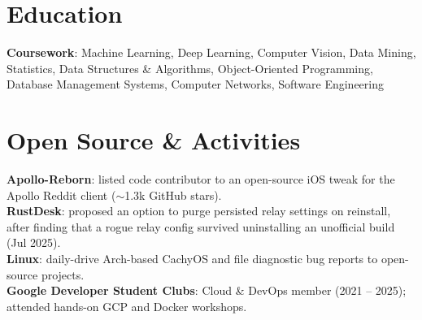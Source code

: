 \documentclass[a4paper]{article}
\begin{document}
\section{Education}
  \resumeSubHeadingListStart
    \eduGNIT
    \vspace{6pt}
    \eduIntermediate
  \resumeSubHeadingListEnd
\vspace{-8pt}
\begin{resumeBlock}
\textbf{Coursework}{: Machine Learning, Deep Learning, Computer Vision, Data Mining, Statistics, Data Structures \& Algorithms, Object-Oriented Programming, Database Management Systems, Computer Networks, Software Engineering}
\end{resumeBlock}
\vspace{-6pt}

\section{Open Source \& Activities}
\begin{resumeBlock}
\textbf{Apollo-Reborn}{: listed code contributor to an open-source iOS tweak for the Apollo Reddit client ($\sim$1.3k GitHub stars).} \\
\textbf{RustDesk}{: proposed an option to purge persisted relay settings on reinstall, after finding that a rogue relay config survived uninstalling an unofficial build (Jul 2025).} \\
\textbf{Linux}{: daily-drive Arch-based CachyOS and file diagnostic bug reports to open-source projects.} \\
\textbf{Google Developer Student Clubs}{: Cloud \& DevOps member (2021 -- 2025); attended hands-on GCP and Docker workshops.}
\end{resumeBlock}
\end{document}
